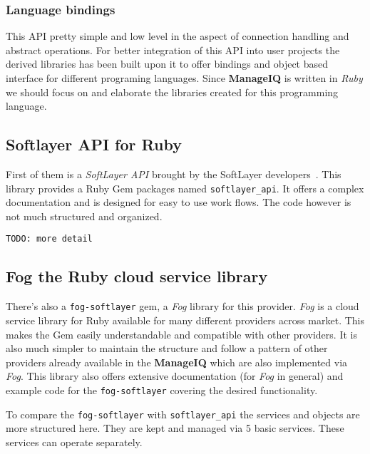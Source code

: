 \subsubsection{Language bindings}
\label{subs:Language bindings}

This API pretty simple and low level in the aspect of connection handling and abstract operations. For better integration of this API into user projects the derived libraries has been built upon it to offer bindings and object based interface for different programing languages. Since \textbf{ManageIQ} is written in \emph{Ruby} we should focus on and elaborate the libraries created for this programming language.

\subsection{Softlayer API for Ruby}
\label{sub:Softlayer-API}

First of them is a \emph{SoftLayer API} brought by the SoftLayer developers~\cite{softlayer_api}. This library provides a Ruby Gem packages named \texttt{softlayer\_api}. It offers a complex documentation and is designed for easy to use work flows. The code however is not much structured and organized.

\noindent\texttt{\color{OliveGreen}TODO: more detail}

\subsection{Fog the Ruby cloud service library}
\label{sub:Fog cloud library}

There's also a \texttt{fog-softlayer} gem, a \emph{Fog} library for this provider. \emph{Fog} is a cloud service library for Ruby available for many different providers across market. This makes the Gem easily understandable and compatible with other providers. It is also much simpler to maintain the structure and follow a pattern of other providers already available in the \textbf{ManageIQ} which are also implemented via \emph{Fog}. This library also offers extensive documentation (for \emph{Fog} in general) and example code for the \texttt{fog-softlayer} covering the desired functionality.

To compare the \texttt{fog-softlayer} with \texttt{softlayer\_api} the services and objects are more structured here. They are kept and managed via 5 basic services. These services can operate separately.

